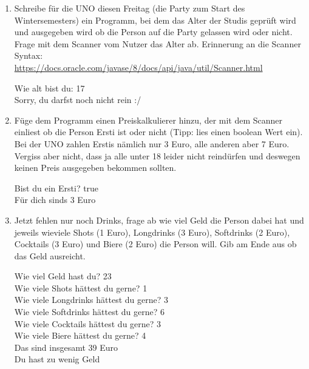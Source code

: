 \documentclass{../../sheet}
\begin{document}
\newpage
{}
\begin{enumerate}
    \item Schreibe für die UNO diesen Freitag (die Party zum Start des Wintersemesters) ein Programm, bei dem das Alter der Studis geprüft wird und ausgegeben wird ob die Person auf die Party gelassen wird oder nicht. Frage mit dem Scanner vom Nutzer das Alter ab. Erinnerung an die Scanner Syntax:\\ \url{https://docs.oracle.com/javase/8/docs/api/java/util/Scanner.html}
    \begin{ausgabe}
        Wie alt bist du: 17\\
        Sorry, du darfst noch nicht rein :/
    \end{ausgabe}
    \item Füge dem Programm einen Preiskalkulierer hinzu, der mit dem Scanner einliest ob die Person Ersti ist oder nicht (Tipp: lies einen boolean Wert ein). Bei der UNO zahlen Erstis nämlich nur 3 Euro, alle anderen aber 7 Euro. Vergiss aber nicht, dass ja alle unter 18 leider nicht reindürfen und deswegen keinen Preis ausgegeben bekommen sollten.
    \begin{ausgabe}
        Bist du ein Ersti? true\\
        Für dich sinds 3 Euro
    \end{ausgabe}
    \item Jetzt fehlen nur noch Drinks, frage ab wie viel Geld die Person dabei hat und jeweils wieviele Shots (1 Euro), Longdrinks (3 Euro), Softdrinks (2 Euro), Cocktails (3 Euro) und Biere (2 Euro) die Person will. Gib am Ende aus ob das Geld ausreicht.
    \begin{ausgabe}
        Wie viel Geld hast du? 23\\
        Wie viele Shots hättest du gerne? 1\\
        Wie viele Longdrinks hättest du gerne? 3\\
        Wie viele Softdrinks hättest du gerne? 6\\
        Wie viele Cocktails hättest du gerne? 3\\
        Wie viele Biere hättest du gerne? 4\\
        Das sind insgesamt 39 Euro\\
        Du hast zu wenig Geld
    \end{ausgabe}
\end{enumerate}
\end{document}
